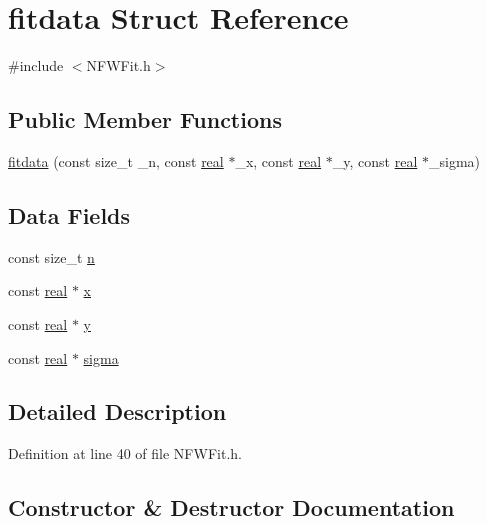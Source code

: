 \section{fitdata Struct Reference}
\label{structfitdata}


{\ttfamily \#include $<$NFWFit.h$>$}

\subsection*{Public Member Functions}
\begin{DoxyCompactItemize}
\item 
\hyperlink{structfitdata_a588ee01742d71fb3cfb02d1efa0a9f86}{fitdata} (const size\_\-t \_\-n, const \hyperlink{Global_8h_a031f8951175b43076c2084a6c2173410}{real} $\ast$\_\-x, const \hyperlink{Global_8h_a031f8951175b43076c2084a6c2173410}{real} $\ast$\_\-y, const \hyperlink{Global_8h_a031f8951175b43076c2084a6c2173410}{real} $\ast$\_\-sigma)
\end{DoxyCompactItemize}
\subsection*{Data Fields}
\begin{DoxyCompactItemize}
\item 
const size\_\-t \hyperlink{structfitdata_a9fd76a473fb5e9845ce8bb182504af18}{n}
\item 
const \hyperlink{Global_8h_a031f8951175b43076c2084a6c2173410}{real} $\ast$ \hyperlink{structfitdata_a490b6d70119259171e01c22dbd679e3c}{x}
\item 
const \hyperlink{Global_8h_a031f8951175b43076c2084a6c2173410}{real} $\ast$ \hyperlink{structfitdata_aa239f7ab3fb04fcc026ba80ea2cc077e}{y}
\item 
const \hyperlink{Global_8h_a031f8951175b43076c2084a6c2173410}{real} $\ast$ \hyperlink{structfitdata_a057f1b2dbcd10242b528fb15218b8363}{sigma}
\end{DoxyCompactItemize}


\subsection{Detailed Description}


Definition at line 40 of file NFWFit.h.



\subsection{Constructor \& Destructor Documentation}
